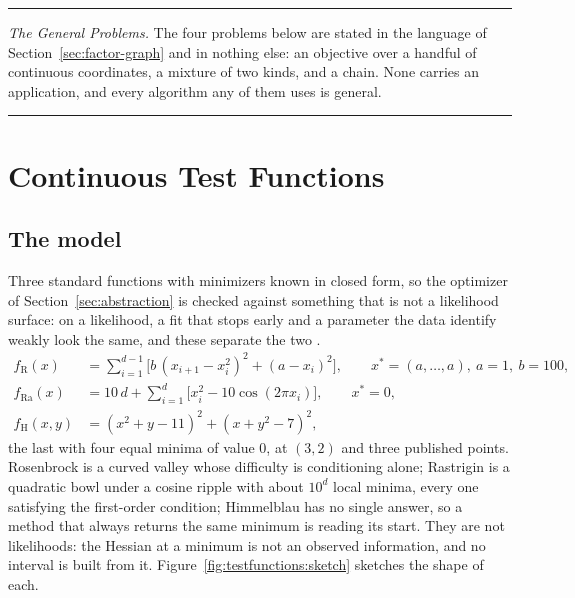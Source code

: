 \documentclass[11pt,a4paper]{article}
\begin{document}
\begin{center}\rule{0.45\linewidth}{0.4pt}\end{center}
\noindent\textit{The General Problems.} The four problems below are stated in the language of
Section~\ref{sec:factor-graph} and in nothing else: an objective over a handful
of continuous coordinates, a mixture of two kinds, and a chain. None carries an
application, and every algorithm any of them uses is general.
\begin{center}\rule{0.45\linewidth}{0.4pt}\end{center}

\section{Continuous Test Functions}
\label{sec:testfunctions}

\subsection{The model}
\label{sec:testfunctions:model}
Three standard functions with minimizers known in closed form, so the
optimizer of Section~\ref{sec:abstraction} is checked against something that
is not a likelihood surface: on a likelihood, a fit that stops early and a
parameter the data identify weakly look the same, and these separate the
two \citep{nocedal2006}.
\begin{align}
  f_{\mathrm{R}}(x) &= \sum_{i=1}^{d-1} \Big[ b\,(x_{i+1} - x_i^2)^2 + (a - x_i)^2 \Big],
  \qquad x^{\ast} = (a, \dots, a),\ a = 1,\ b = 100,
  \label{eq:rosenbrock} \\
  f_{\mathrm{Ra}}(x) &= 10\,d + \sum_{i=1}^{d} \Big[ x_i^2 - 10 \cos(2\pi x_i) \Big],
  \qquad x^{\ast} = 0,
  \label{eq:rastrigin} \\
  f_{\mathrm{H}}(x, y) &= (x^2 + y - 11)^2 + (x + y^2 - 7)^2,
  \label{eq:himmelblau}
\end{align}
the last with four equal minima of value $0$, at $(3, 2)$ and three published
points. Rosenbrock is a curved valley whose difficulty is conditioning alone;
Rastrigin is a quadratic bowl under a cosine ripple with about $10^d$ local
minima, every one satisfying the first-order condition; Himmelblau has no
single answer, so a method that always returns the same minimum is reading its
start. They are not likelihoods: the Hessian at a minimum is not an observed
information, and no interval is built from it.
Figure~\ref{fig:testfunctions:sketch} sketches the shape of each.
\end{document}
